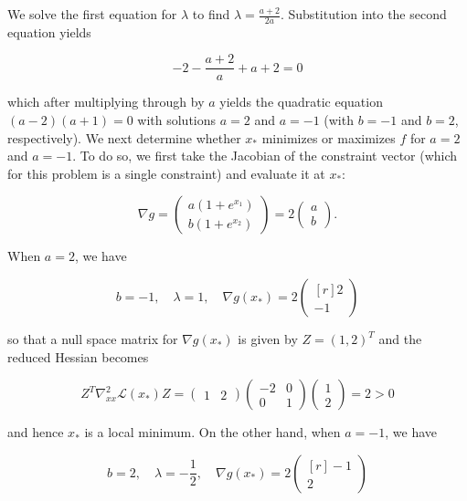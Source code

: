 \begin{solution}
    We solve the first equation for $\lambda$ to find $\lambda = \frac{a + 2}{2a}$. Substitution into the second 
    equation yields

    $$
    -2 - \frac{a + 2}{a} + a + 2 = 0
    $$

    which after multiplying through by $a$ yields the quadratic equation $(a - 2)(a + 1) = 0$ with solutions $a = 2$ and
    $a = -1$ (with $b = -1$ and $b = 2$, respectively). We next determine whether $x_*$ minimizes or maximizes $f$ for
    $a = 2$ and $a = -1$. To do so, we first take the Jacobian of the constraint vector (which for this problem is a
    single constraint) and evaluate it at $x_*$:

    $$
    \nabla g = \begin{pmatrix*}
        a \left(1 + e^{x_1} \right) \\
        b \left(1 + e^{x_2} \right)
    \end{pmatrix*} = 2 \begin{pmatrix*}
        a \\
        b
    \end{pmatrix*}.
    $$

    When $a = 2$, we have 
    
    $$
    b = -1, \quad \lambda = 1, \quad \nabla g(x_*) = 2 \begin{pmatrix*}[r]
        2 \\
       -1
    \end{pmatrix*}
    $$

    so that a null space matrix for $\nabla g(x_*)$ is given by $Z = (1, 2)^T$ and the reduced Hessian becomes

    $$
    Z^T \nabla^2_{xx} \mathcal{L}(x_*) Z = \begin{pmatrix*}
        1 & 2
    \end{pmatrix*} \begin{pmatrix*}
        -2 & 0 \\
         0 & 1
    \end{pmatrix*} \begin{pmatrix*}
        1 \\
        2
    \end{pmatrix*} = 2 > 0
    $$

    and hence $x_*$ is a local minimum. On the other hand, when $a = -1$, we have

    $$
    b = 2, \quad \lambda = -\frac{1}{2}, \quad \nabla g(x_*) = 2 \begin{pmatrix*}[r]
       -1 \\
        2
    \end{pmatrix*}
    $$


\end{solution}

